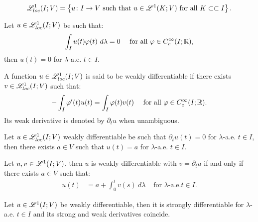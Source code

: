 \begin{definition}
    \begin{align}
        \mathscr{L}^{1}_{loc}(I; V) = \left\{ u\colon I \rightarrow V  \text{ such that } u \in \mathscr{L}^{1}(K; V) \text{ for all } K \subset \subset I \right\}.
    \end{align}
\end{definition}

\begin{corollary}
    Let $u \in \mathscr{L}^{1}_{loc}(I; V)$ be such that:
    \begin{align}
        \int_I u(t) \varphi(t) ~ d \lambda &= 0 &\text{ for all } \varphi \in C_c^{\infty}(I; \mathbb{R}),
    \end{align}
    then $u(t) = 0$ for $\lambda$-a.e. $t \in I$.
\end{corollary}

\begin{definition}
    A function $u \in \mathscr{L}^{1}_{loc}(I; V)$ is said to be weakly differentiable if there exists $v \in \mathscr{L}^{1}_{loc}(I; V)$ such that:
    \begin{align}
        - \int_I \varphi^{\prime}(t) u(t) &= \int_I \varphi(t) v(t) &\text{ for all } \varphi \in C_c^{\infty}(I; \mathbb{R}).
    \end{align}
    Its weak derivative is denoted by $\partial_t u$ when unambiguous.
\end{definition}

\begin{lemma}
    Let $u \in \mathscr{L}^{1}_{loc}(I; V)$ weakly differentiable be such that $\partial_t u(t) = 0$ for $\lambda$-a.e. $t \in I$, then there exists $a \in V$ such that $u(t) = a$ for $\lambda$-a.e. $t \in I$.
\end{lemma}

\begin{theorem}
    Let $u, v \in \mathscr{L}^{1}(I; V)$, then $u$ is weakly differentiable with $v = \partial_t u$ if and only if there exists $a \in V$ such that:
    \begin{align}
        u(t) &= a + \int_0^t v(s) ~ d \lambda &\text{ for } \lambda \text{-a.e.} t \in I.
    \end{align}
\end{theorem}

\begin{corollary}
    Let $u \in \mathscr{L}^{1}(I; V)$ be weakly differentiable, then it is strongly differentiable for $\lambda$-a.e. $t \in I$ and its strong and weak derivatives coincide.
\end{corollary}

